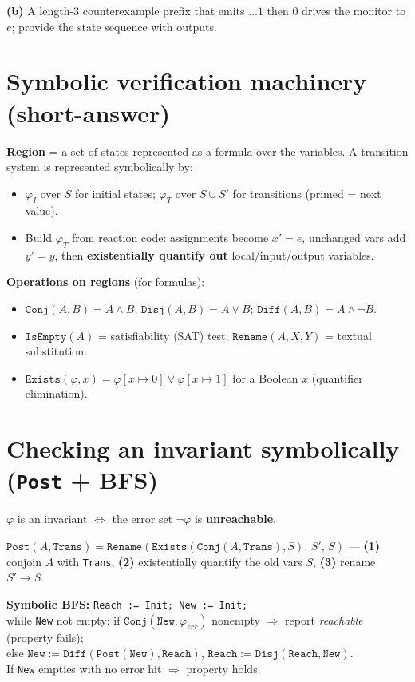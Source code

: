 \textbf{(b)} A length-3 counterexample prefix that emits $\dots1$ then $0$ drives the monitor to $e$; provide the state sequence with outputs.

\section{Symbolic verification machinery (short-answer)}
\textbf{Region} = a set of states represented as a formula over the variables. A transition system is represented symbolically by:
\begin{itemize}
  \item $\varphi_I$ over $S$ for initial states; \quad $\varphi_T$ over $S\cup S'$ for transitions (primed = next value).
  \item Build $\varphi_T$ from reaction code: assignments become $x'=e$, unchanged vars add $y'=y$, then \textbf{existentially quantify out} local/input/output variables.
\end{itemize}
\textbf{Operations on regions} (for formulas):
\begin{itemize}
  \item $\texttt{Conj}(A,B)=A\wedge B$; \quad $\texttt{Disj}(A,B)=A\vee B$; \quad $\texttt{Diff}(A,B)=A\wedge\neg B$.
  \item $\texttt{IsEmpty}(A)$ = satisfiability (SAT) test; \quad $\texttt{Rename}(A,X,Y)$ = textual substitution.
  \item $\texttt{Exists}(\varphi,x)=\varphi[x\!\mapsto\!0]\vee\varphi[x\!\mapsto\!1]$ for a Boolean $x$ (quantifier elimination).
\end{itemize}

\section{Checking an invariant symbolically (\texttt{Post} + BFS)}
$\varphi$ is an invariant $\iff$ the error set $\neg\varphi$ is \textbf{unreachable}.
\begin{keybox}
$\texttt{Post}(A,\texttt{Trans})=\texttt{Rename}(\texttt{Exists}(\texttt{Conj}(A,\texttt{Trans}),S),\,S',\,S)$
\quad --- \textbf{(1)} conjoin $A$ with \texttt{Trans}, \textbf{(2)} existentially quantify the old vars $S$, \textbf{(3)} rename $S'\!\to\!S$.
\end{keybox}

\textbf{Symbolic BFS:} \texttt{Reach := Init; New := Init;}\\
while \texttt{New} not empty: if $\texttt{Conj}(\texttt{New},\varphi_{err})$ nonempty $\Rightarrow$ report \emph{reachable} (property fails);\\
else $\texttt{New}:=\texttt{Diff}(\texttt{Post}(\texttt{New}),\texttt{Reach})$, $\texttt{Reach}:=\texttt{Disj}(\texttt{Reach},\texttt{New})$.\\
If \texttt{New} empties with no error hit $\Rightarrow$ property holds.

